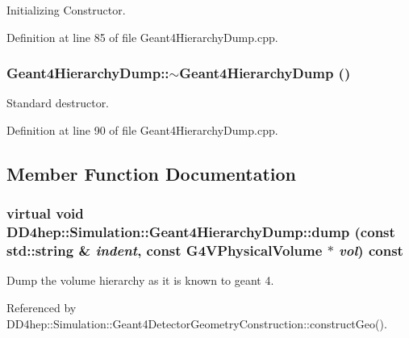 Initializing Constructor. 

Definition at line 85 of file Geant4HierarchyDump.cpp.\hypertarget{class_d_d4hep_1_1_simulation_1_1_geant4_hierarchy_dump_a47d7985316101ad8cbe95c844746f847}{
\subsubsection[{$\sim$Geant4HierarchyDump}]{\setlength{\rightskip}{0pt plus 5cm}Geant4HierarchyDump::$\sim$Geant4HierarchyDump ()}}
\label{class_d_d4hep_1_1_simulation_1_1_geant4_hierarchy_dump_a47d7985316101ad8cbe95c844746f847}


Standard destructor. 

Definition at line 90 of file Geant4HierarchyDump.cpp.

\subsection{Member Function Documentation}
\hypertarget{class_d_d4hep_1_1_simulation_1_1_geant4_hierarchy_dump_a34de46e7fbc4a82d126e1ea77c1f0c60}{
\subsubsection[{dump}]{\setlength{\rightskip}{0pt plus 5cm}virtual void DD4hep::Simulation::Geant4HierarchyDump::dump (const std::string \& {\em indent}, \/  const G4VPhysicalVolume $\ast$ {\em vol}) const}}
\label{class_d_d4hep_1_1_simulation_1_1_geant4_hierarchy_dump_a34de46e7fbc4a82d126e1ea77c1f0c60}


Dump the volume hierarchy as it is known to geant 4. 

Referenced by DD4hep::Simulation::Geant4DetectorGeometryConstruction::constructGeo().

